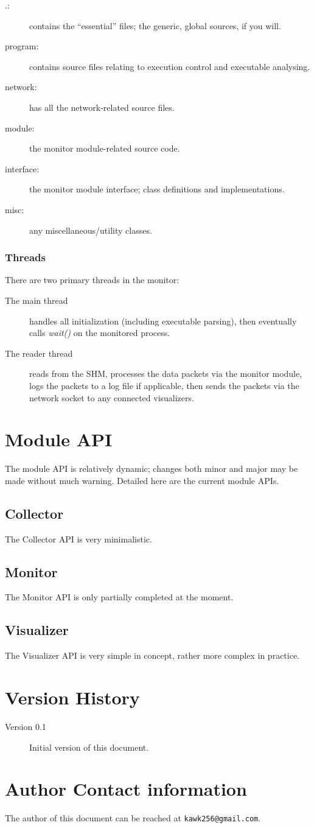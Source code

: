 \documentclass[a4paper,10pt]{report}
\begin{document}
\begin{description}
 \item[.:] contains the ``essential'' files; the generic, global sources, if you will.
 \item[program:] contains source files relating to execution control and executable analysing.
 \item[network:] has all the network-related source files.
 \item[module:] the monitor module-related source code.
 \item[interface:] the monitor module interface; class definitions and implementations.
 \item[misc:] any miscellaneous/utility classes.
\end{description}

\subsection{Threads}

There are two primary threads in the monitor:
\begin{description}
 \item[\textnormal{The} main thread] handles all initialization (including executable parsing), then eventually calls \emph{wait()} on
  the monitored process.
 \item[\textnormal{The} reader thread] reads from the SHM, processes the data packets via the monitor module, logs the packets to a log
  file if applicable, then sends the packets via the network socket to any connected visualizers.
\end{description}

\chapter{Module API}
The module API is relatively dynamic; changes both minor and major may be made without much warning. Detailed here are the
current module APIs.
\section{Collector}
The Collector API is very minimalistic. 
\section{Monitor}
The Monitor API is only partially completed at the moment.
\section{Visualizer}
The Visualizer API is very simple in concept, rather more complex in practice.

\appendix

\chapter{Version History}
\begin{description}
 \item[Version 0.1] Initial version of this document.
\end{description}

\chapter{Author Contact information}
The author of this document can be reached at \texttt{kawk256@gmail.com}.
\end{document}
